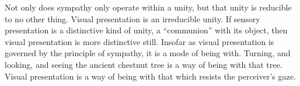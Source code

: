 \documentclass[12pt]{article}
\begin{document}

Not only does sympathy only operate within a unity, but that unity is reducible to no other thing. Visual presentation is an irreducible unity. If sensory presentation is a distinctive kind of unity, a ``communion'' with its object, then visual presentation is more distinctive still. Insofar as visual presentation is governed by the principle of sympathy, it is a mode of being with. Turning, and looking, and seeing the ancient chestnut tree is a way of being with that tree. Visual presentation is a way of being with that which resists the perceiver's gaze.
\end{document}
